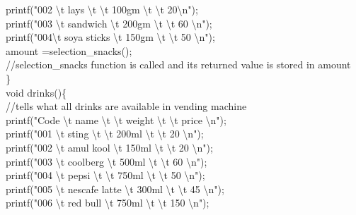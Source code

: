 \documentclass[10pt,a4paper]{article}
\begin{document}
\begin{flushleft}
    \hspace*{0.5cm}  printf("002 \textbackslash t lays \textbackslash t \textbackslash t 100gm \textbackslash t \textbackslash t 20\textbackslash n");\\
    \hspace*{0.5cm}  printf("003 \textbackslash t sandwich \textbackslash t 200gm \textbackslash t \textbackslash t 60 \textbackslash n");\\
    \hspace*{0.5cm}  printf("004\textbackslash t soya sticks \textbackslash t 150gm \textbackslash t \textbackslash t 50 \textbackslash n");\\
    \hspace*{0.5cm}  amount =selection\_snacks();\\   //selection\_snacks function is called and its returned value is stored in amount\\
\}\\
void drinks()\{\\   //tells what all drinks are available in vending machine\\
    \hspace*{0.5cm}  printf("Code \textbackslash t name \textbackslash t  \textbackslash t weight \textbackslash t  \textbackslash t price \textbackslash n");\\
    \hspace*{0.5cm}  printf("001 \textbackslash t sting \textbackslash t \textbackslash t 200ml \textbackslash t \textbackslash t 20 \textbackslash n");\\
    \hspace*{0.5cm}  printf("002 \textbackslash t amul kool \textbackslash t 150ml \textbackslash t \textbackslash t 20 \textbackslash n");\\
    \hspace*{0.5cm}  printf("003 \textbackslash t coolberg \textbackslash t 500ml \textbackslash t \textbackslash t 60 \textbackslash n");\\
    \hspace*{0.5cm}  printf("004 \textbackslash t pepsi \textbackslash t \textbackslash t 750ml \textbackslash t \textbackslash t 50 \textbackslash n");\\
    \hspace*{0.5cm}  printf("005 \textbackslash t nescafe latte \textbackslash t 300ml \textbackslash t \textbackslash t 45 \textbackslash n");\\
    \hspace*{0.5cm}  printf("006 \textbackslash t red bull \textbackslash t 750ml \textbackslash t \textbackslash t 150 \textbackslash n");\\

\end{flushleft}
\end{document}
